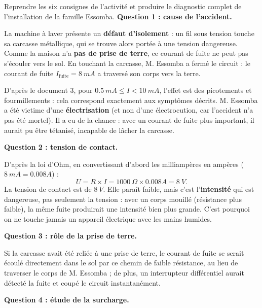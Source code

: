 \documentclass[11pt]{article}
\begin{document}
\begin{exoresolu}
Reprendre les six consignes de l'activité et produire le diagnostic complet de l'installation de la famille Essomba.
\tcblower
\textbf{Question 1 : cause de l'accident.}

La machine à laver présente un \textbf{défaut d'isolement} : un fil sous tension touche sa carcasse métallique, qui se trouve alors portée à une tension dangereuse. Comme la maison n'a \textbf{pas de prise de terre}, ce courant de fuite ne peut pas s'écouler vers le sol. En touchant la carcasse, M. Essomba a fermé le circuit : le courant de fuite $I_{\text{fuite}} = \SI{8}{mA}$ a traversé son corps vers la terre.

D'après le document 3, pour $\SI{0,5}{mA} \leq I < \SI{10}{mA}$, l'effet est des picotements et fourmillements : cela correspond exactement aux symptômes décrits. M. Essomba a été victime d'une \textbf{électrisation} (et non d'une électrocution, car l'accident n'a pas été mortel). Il a eu de la chance : avec un courant de fuite plus important, il aurait pu être tétanisé, incapable de lâcher la carcasse.

\textbf{Question 2 : tension de contact.}

D'après la loi d'Ohm, en convertissant d'abord les milliampères en ampères ($\SI{8}{mA} = \num{0,008}{A}$) :
\[
U = R \times I = \SI{1000}{\Omega} \times \num{0,008}{A} = \SI{8}{V}.
\]
La tension de contact est de $\SI{8}{V}$. Elle paraît faible, mais c'est l'\textbf{intensité} qui est dangereuse, pas seulement la tension : avec un corps mouillé (résistance plus faible), la même fuite produirait une intensité bien plus grande. C'est pourquoi on ne touche jamais un appareil électrique avec les mains humides.

\textbf{Question 3 : rôle de la prise de terre.}

Si la carcasse avait été reliée à une prise de terre, le courant de fuite se serait écoulé directement dans le sol par ce chemin de faible résistance, au lieu de traverser le corps de M. Essomba ; de plus, un interrupteur différentiel aurait détecté la fuite et coupé le circuit instantanément.

\textbf{Question 4 : étude de la surcharge.}


\end{exoresolu}
\end{document}
